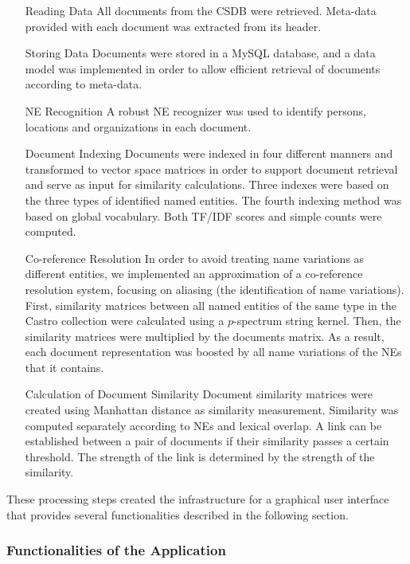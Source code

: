 \begin{enumerate}
\item[Reading Data] All documents from the CSDB were retrieved. Meta-data provided with each document was extracted from its header.
\item[Storing Data] Documents were stored in a MySQL database, and a data model was implemented in order to allow efficient retrieval of documents according to meta-data.
\item[NE Recognition] A robust NE recognizer was used to identify persons, locations and organizations in each document.
\item[Document Indexing] Documents were indexed in four different manners and transformed to vector space matrices in order to support document retrieval and serve as input for similarity calculations. Three indexes were based on the three types of identified named entities. The fourth indexing method was based on global vocabulary. Both TF/IDF scores and simple counts were computed.
\item[Co-reference Resolution] In order to avoid treating name variations as different entities, we implemented an approximation of a co-reference resolution system, focusing on aliasing (the identification of name variations).
First, similarity matrices between all named entities of the same type in the Castro collection were calculated using a $p$-spectrum string kernel.
Then, the similarity matrices were multiplied by the documents matrix. As a result, each document representation was boosted by all name 
variations of the NEs that it contains.
\item[Calculation of Document Similarity] Document similarity matrices were created using Manhattan distance as similarity measurement. 
Similarity was computed separately according to NEs and lexical overlap. 
A link can be established between a pair of documents if their similarity passes a certain threshold. 
The strength of the link is determined by the strength of the similarity.
\end{enumerate}

These processing steps created the infrastructure for a graphical user interface that provides several
functionalities described in the following section.

\subsubsection{Functionalities of the Application}

